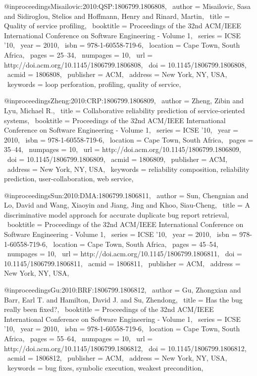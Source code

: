 @inproceedings{Misailovic:2010:QSP:1806799.1806808,
 author = {Misailovic, Sasa and Sidiroglou, Stelios and Hoffmann, Henry and Rinard, Martin},
 title = {Quality of service profiling},
 booktitle = {Proceedings of the 32nd ACM/IEEE International Conference on Software Engineering - Volume 1},
 series = {ICSE '10},
 year = {2010},
 isbn = {978-1-60558-719-6},
 location = {Cape Town, South Africa},
 pages = {25--34},
 numpages = {10},
 url = {http://doi.acm.org/10.1145/1806799.1806808},
 doi = {10.1145/1806799.1806808},
 acmid = {1806808},
 publisher = {ACM},
 address = {New York, NY, USA},
 keywords = {loop perforation, profiling, quality of service},
} 

@inproceedings{Zheng:2010:CRP:1806799.1806809,
 author = {Zheng, Zibin and Lyu, Michael R.},
 title = {Collaborative reliability prediction of service-oriented systems},
 booktitle = {Proceedings of the 32nd ACM/IEEE International Conference on Software Engineering - Volume 1},
 series = {ICSE '10},
 year = {2010},
 isbn = {978-1-60558-719-6},
 location = {Cape Town, South Africa},
 pages = {35--44},
 numpages = {10},
 url = {http://doi.acm.org/10.1145/1806799.1806809},
 doi = {10.1145/1806799.1806809},
 acmid = {1806809},
 publisher = {ACM},
 address = {New York, NY, USA},
 keywords = {reliability composition, reliability prediction, user-collaboration, web service},
} 

@inproceedings{Sun:2010:DMA:1806799.1806811,
 author = {Sun, Chengnian and Lo, David and Wang, Xiaoyin and Jiang, Jing and Khoo, Siau-Cheng},
 title = {A discriminative model approach for accurate duplicate bug report retrieval},
 booktitle = {Proceedings of the 32nd ACM/IEEE International Conference on Software Engineering - Volume 1},
 series = {ICSE '10},
 year = {2010},
 isbn = {978-1-60558-719-6},
 location = {Cape Town, South Africa},
 pages = {45--54},
 numpages = {10},
 url = {http://doi.acm.org/10.1145/1806799.1806811},
 doi = {10.1145/1806799.1806811},
 acmid = {1806811},
 publisher = {ACM},
 address = {New York, NY, USA},
} 

@inproceedings{Gu:2010:BRF:1806799.1806812,
 author = {Gu, Zhongxian and Barr, Earl T. and Hamilton, David J. and Su, Zhendong},
 title = {Has the bug really been fixed?},
 booktitle = {Proceedings of the 32nd ACM/IEEE International Conference on Software Engineering - Volume 1},
 series = {ICSE '10},
 year = {2010},
 isbn = {978-1-60558-719-6},
 location = {Cape Town, South Africa},
 pages = {55--64},
 numpages = {10},
 url = {http://doi.acm.org/10.1145/1806799.1806812},
 doi = {10.1145/1806799.1806812},
 acmid = {1806812},
 publisher = {ACM},
 address = {New York, NY, USA},
 keywords = {bug fixes, symbolic execution, weakest precondition},
} 

